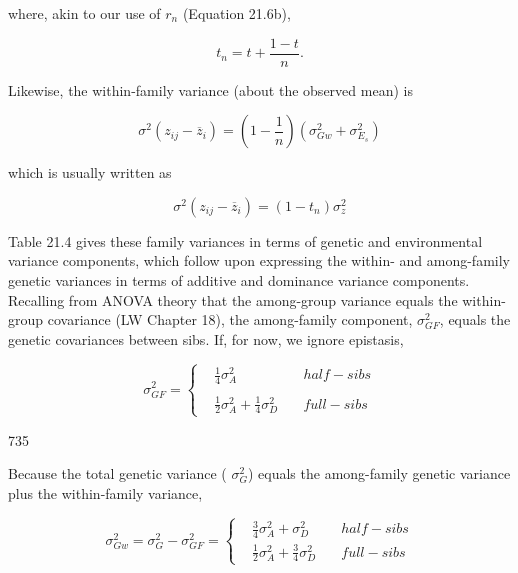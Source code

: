 \documentclass{article}
\begin{document}
where, akin to our use of  $ r_{n} $ (Equation 21.6b),

\begin{equation}
t_{n}=t+\frac{1-t}{n}.
\tag{21.9c}
\label{eq:21_9c}
\end{equation}

Likewise, the within-family variance (about the observed mean) is

\begin{equation}
\sigma^{2}(z_{i j}-\overline{{z}}_{i})=\left(1-\frac{1}{n}\right)\left(\sigma_{G w}^{2}+\sigma_{E_{s}}^{2}\right)
\tag{21.10a}
\label{eq:21_10a}
\end{equation}

which is usually written as

\begin{equation}
\sigma^{2}(z_{i j}-\overline{{z}}_{i})=\left(1-t_{n}\right)\sigma_{z}^{2}
\tag{21.10b}
\label{eq:21_10b}
\end{equation}

Table 21.4 gives these family variances in terms of genetic and environmental variance components, which follow upon expressing the within- and among-family genetic variances in terms of additive and dominance variance components. Recalling from ANOVA theory that the among-group variance equals the within-group covariance (LW Chapter 18), the among-family component,  $ \sigma_{GF}^{2} $, equals the genetic covariances between sibs. If, for now, we ignore epistasis,

\begin{equation}
\sigma_{GF}^{2}=\left\{\begin{aligned}&\frac{1}{4}\sigma_{A}^{2}&\quad half-sibs\\ &\\ &\frac{1}{2}\sigma_{A}^{2}+\frac{1}{4}\sigma_{D}^{2}&\quad full-sibs\end{aligned}\right.
\tag{21.11a}
\label{eq:21_11a}
\end{equation}

735

Because the total genetic variance ( $ \sigma_{G}^{2} $) equals the among-family genetic variance plus the within-family variance,

\begin{equation}
\sigma_{Gw}^{2}=\sigma_{G}^{2}-\sigma_{GF}^{2}=\left\{\begin{aligned}&\frac{3}{4}\sigma_{A}^{2}+\sigma_{D}^{2}\quad&half-sibs\\ &\frac{1}{2}\sigma_{A}^{2}+\frac{3}{4}\sigma_{D}^{2}\quad&full-sibs\end{aligned}\right.
\tag{21.11b}
\label{eq:21_11b}
\end{equation}
\end{document}

